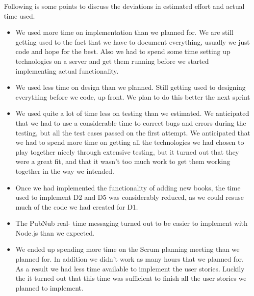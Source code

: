 Following is some points to discuss the deviations in estimated effort and actual time used.
\begin{itemize}
\item We used more time on implementation than we planned for. We are still getting used to the fact that we have to document everything, usually we just code and hope for the best. Also we had to spend some time setting up technologies on a server and get them running before we started implementing actual functionality.
\item We used less time on design than we planned. Still getting used to designing everything before we code, up front. We plan to do this better the next sprint
\item We used quite a lot of time less on testing than we estimated. We anticipated that we had to use a considerable time to correct bugs and errors during the testing, but all the test cases passed on the first attempt. We anticipated that we had to spend more time on getting all the technologies we had chosen to play together nicely through extensive testing, but it turned out that they were a great fit, and that it wasn't too much work to get them working together in the way we intended.
\item Once we had implemented the functionality of adding new books, the time used to implement D2 and D5 was considerably reduced, as we could resuse much of the code we had created for D1.
\item The PubNub real- time messaging turned out to be easier to implement with Node.js than we expected. 
\item We ended up spending more time on the Scrum planning meeting than we planned for. In addition we didn't work as many hours that we planned for. As a result we had less time available to implement the user stories. Luckily the it turned out that this time was sufficient to finish all the user stories we planned to implement.
\end{itemize}

